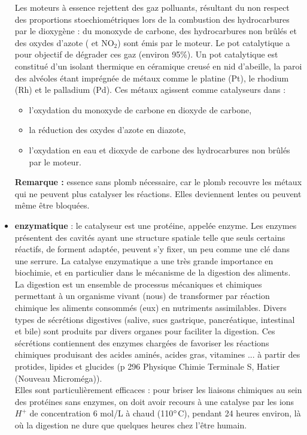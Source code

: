 \documentclass[11pt,a4paper]{report}
\begin{document}
\begin{itemize}
	Les moteurs à essence rejettent des gaz polluants, résultant du non respect des proportions 	stoechiométriques lors de la combustion des hydrocarbures par le dioxygène : du monoxyde de carbone, des hydrocarbures non brûlés et des oxydes d'azote ( et $\text{NO}_2$) sont émis par le moteur. Le pot catalytique a pour objectif de dégrader ces gaz (environ 95\%). Un pot catalytique est constitué d'un isolant thermique en céramique creusé en nid d'abeille, la paroi des alvéoles étant imprégnée de métaux comme le platine (Pt), le rhodium (Rh) et le palladium (Pd). Ces métaux agissent comme catalyseurs dans :
	\begin{itemize}
		\item l'oxydation du monoxyde de carbone en dioxyde de carbone,
		\item la réduction des oxydes d'azote en diazote,
		\item l'oxydation en eau et dioxyde de carbone des hydrocarbures non brûlés par le 						moteur.\\
	\end{itemize}
	\textbf{Remarque :} essence sans plomb nécessaire, car le plomb recouvre les métaux qui ne 		peuvent plus catalyser les réactions. Elles deviennent lentes ou peuvent même être bloquées.\\
	
	\item \textbf{enzymatique} : le catalyseur est une protéine, appelée enzyme. Les enzymes présentent des cavités ayant une structure spatiale telle que seuls certains réactifs, de forment adaptée, peuvent s'y fixer, un peu comme une clé dans une serrure. La catalyse enzymatique a une  très grande importance en biochimie, et en particulier dans le mécanisme de la digestion des aliments.\\ 
	
	La digestion est un ensemble de processus mécaniques et chimiques permettant à un organisme 	vivant (nous) de transformer par réaction chimique les aliments consommés (eux) en nutriments assimilables. Divers types de sécrétions digestives (salive, sucs gastrique, pancréatique, intestinal et bile) sont produits par divers organes pour faciliter la digestion. Ces sécrétions contiennent des enzymes chargées de favoriser les réactions chimiques produisant des acides aminés, acides gras, vitamines ... à partir des protides, lipides et glucides (p 296 Physique Chimie Terminale S, Hatier (Nouveau Microméga)).\\
	
	Elles sont particulièrement efficaces : pour briser les liaisons chimiques au sein des protéines sans enzymes, on doit avoir recours à une catalyse par les ions $H^+$ de concentration 6 mol/L à chaud (110$\degree$C), pendant 24 heures environ, là où la digestion ne dure que quelques heures chez l'être humain.
\end{itemize}
\end{document}
